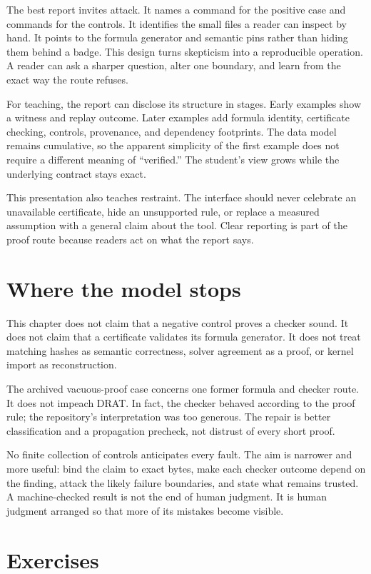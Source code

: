 The best report invites attack. It names a command for the positive case and
commands for the controls. It identifies the small files a reader can inspect
by hand. It points to the formula generator and semantic pins rather than
hiding them behind a badge. This design turns skepticism into a reproducible
operation. A reader can ask a sharper question, alter one boundary, and learn
from the exact way the route refuses.

For teaching, the report can disclose its structure in stages. Early examples
show a witness and replay outcome. Later examples add formula identity,
certificate checking, controls, provenance, and dependency footprints. The
data model remains cumulative, so the apparent simplicity of the first
example does not require a different meaning of ``verified.'' The student's
view grows while the underlying contract stays exact.

This presentation also teaches restraint. The interface should never celebrate
an unavailable certificate, hide an unsupported rule, or replace a measured
assumption with a general claim about the tool. Clear reporting is part of the
proof route because readers act on what the report says.

\section{Where the model stops}

This chapter does not claim that a negative control proves a checker sound.
It does not claim that a certificate validates its formula generator. It does
not treat matching hashes as semantic correctness, solver agreement as a
proof, or kernel import as reconstruction.

The archived vacuous-proof case concerns one former formula and checker route.
It does not impeach DRAT. In fact, the checker behaved according to the proof
rule; the repository's interpretation was too generous. The repair is better
classification and a propagation precheck, not distrust of every short proof.

No finite collection of controls anticipates every fault. The aim is narrower
and more useful: bind the claim to exact bytes, make each checker outcome
depend on the finding, attack the likely failure boundaries, and state what
remains trusted. A machine-checked result is not the end of human judgment. It
is human judgment arranged so that more of its mistakes become visible.

\section{Exercises}


